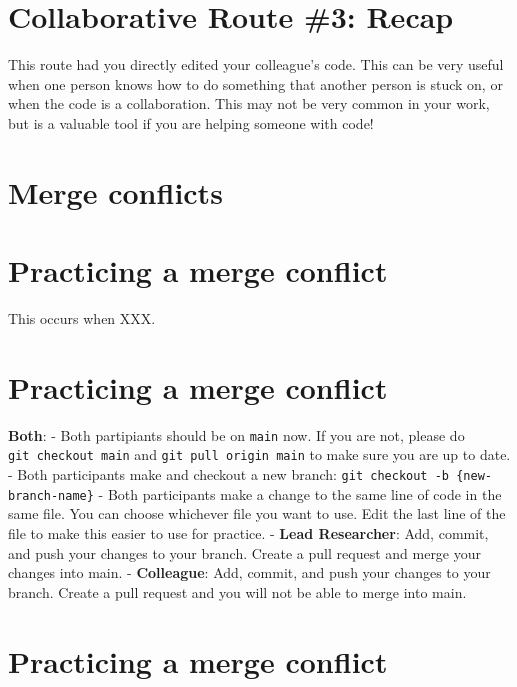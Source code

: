 \documentclass[
]{book}
\begin{document}
\hypertarget{collaborative-route-3-recap}{%
\section{Collaborative Route \#3: Recap}\label{collaborative-route-3-recap}}

This route had you directly edited your colleague's code. This can be very useful when one person knows how to do something that another person is stuck on, or when the code is a collaboration. This may not be very common in your work, but is a valuable tool if you are helping someone with code!

\hypertarget{merge-conflicts}{%
\section{Merge conflicts}\label{merge-conflicts}}

\hypertarget{practicing-a-merge-conflict}{%
\section{Practicing a merge conflict}\label{practicing-a-merge-conflict}}

This occurs when XXX.

\hypertarget{practicing-a-merge-conflict-1}{%
\section{Practicing a merge conflict}\label{practicing-a-merge-conflict-1}}

\textbf{Both}:
- Both partipiants should be on \texttt{main} now. If you are not, please do \texttt{git\ checkout\ main} and \texttt{git\ pull\ origin\ main} to make sure you are up to date.
- Both participants make and checkout a new branch: \texttt{git\ checkout\ -b\ \{new-branch-name\}}
- Both participants make a change to the same line of code in the same file. You can choose whichever file you want to use. Edit the last line of the file to make this easier to use for practice.
- \textbf{Lead Researcher}: Add, commit, and push your changes to your branch. Create a pull request and merge your changes into main.
- \textbf{Colleague}: Add, commit, and push your changes to your branch. Create a pull request and you will not be able to merge into main.

\hypertarget{practicing-a-merge-conflict-2}{%
\section{Practicing a merge conflict}\label{practicing-a-merge-conflict-2}}
\end{document}
